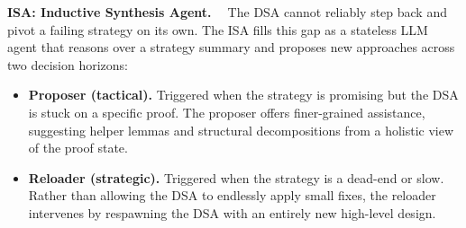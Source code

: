 
\textbf{ISA: Inductive Synthesis Agent. \ } The DSA cannot reliably step back and pivot a failing strategy on its own. The ISA fills this gap as a stateless LLM agent that reasons over a strategy summary and proposes new approaches across two decision horizons: \begin{itemize}[leftmargin=*,nosep,topsep=2pt] 
\item \textbf{Proposer (tactical).} Triggered when the strategy is promising but the DSA is stuck on a specific proof. The proposer offers finer-grained assistance, suggesting helper lemmas and structural decompositions from a holistic view of the proof state.
\item \textbf{Reloader (strategic).} Triggered when the strategy is a dead-end or slow. Rather than allowing the DSA to endlessly apply small fixes, the reloader intervenes by respawning the DSA with an entirely new high-level design.
\end{itemize}


% 






